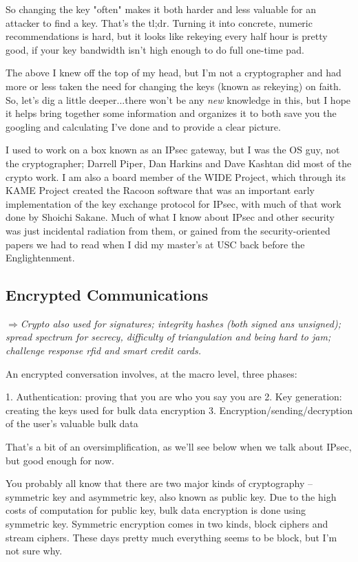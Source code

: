 \documentclass[%
 aip,
 jmp,%
 amsmath,amssymb,
 reprint,%
]{revtex4-1}
\def\comment#1{{\color{ForestGreen}$\Rightarrow${\small\em #1}}}
\begin{document}
So changing the key "often" makes it both harder and less valuable for
an attacker to find a key.  That's the tl;dr.  Turning it into
concrete, numeric recommendations is hard, but it looks like rekeying
every half hour is pretty good, if your key bandwidth isn't high
enough to do full one-time pad.

The above I knew off the top of my head, but I'm not a cryptographer
and had more or less taken the need for changing the keys (known as
rekeying) on faith.  So, let's dig a little deeper...there won't be
any \emph{new} knowledge in this, but I hope it helps bring together some
information and organizes it to both save you the googling and
calculating I've done and to provide a clear picture.

I used to work on a box known as an IPsec gateway, but I was the OS
guy, not the cryptographer; Darrell Piper, Dan Harkins and Dave
Kashtan did most of the crypto work.  I am also a board member of the
WIDE Project, which through its KAME Project created the Racoon
software that was an important early implementation of the key
exchange protocol for IPsec, with much of that work done by Shoichi
Sakane.  Much of what I know about IPsec and other security was just
incidental radiation from them, or gained from the security-oriented
papers we had to read when I did my master's at USC back before the
Englightenment.

\subsection{Encrypted Communications}

\comment{Crypto also used for signatures; integrity hashes (both
  signed ans unsigned); spread spectrum for secrecy, difficulty of
  triangulation and being hard to jam; challenge response rfid and
  smart credit cards.}

An encrypted conversation involves, at the macro level, three phases:

	1. Authentication: proving that you are who you say you are
	2. Key generation: creating the keys used for bulk data encryption
	3. Encryption/sending/decryption of the user's valuable bulk data

That's a bit of an oversimplification, as we'll see below when we talk
about IPsec, but good enough for now.

You probably all know that there are two major kinds of cryptography
-- symmetric key and asymmetric key, also known as public key.  Due to
the high costs of computation for public key, bulk data encryption is
done using symmetric key.  Symmetric encryption comes in two kinds,
block ciphers and stream ciphers.  These days pretty much everything
seems to be block, but I'm not sure why.
\end{document}
